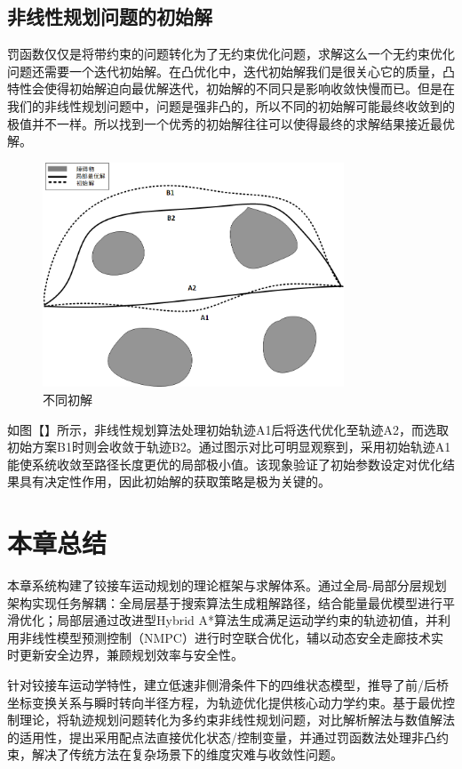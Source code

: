 \documentclass[master,academic]{ysuthesis} %
\begin{document}
		\subsection{非线性规划问题的初始解}
		罚函数仅仅是将带约束的问题转化为了无约束优化问题，求解这么一个无约束优化问题还需要一个迭代初始解。在凸优化中，迭代初始解我们是很关心它的质量，凸特性会使得初始解迫向最优解迭代，初始解的不同只是影响收敛快慢而已。但是在我们的非线性规划问题中，问题是强非凸的，所以不同的初始解可能最终收敛到的极值并不一样。所以找到一个优秀的初始解往往可以使得最终的求解结果接近最优解。
		\begin{figure}[!ht]
			\centering
			\includegraphics[width=0.8\textwidth]{不同初解.png}
			\caption{不同初解}
			\label{fig:不同初解}
		\end{figure}
		如图【】所示，非线性规划算法处理初始轨迹A1后将迭代优化至轨迹A2，而选取初始方案B1时则会收敛于轨迹B2。通过图示对比可明显观察到，采用初始轨迹A1能使系统收敛至路径长度更优的局部极小值。该现象验证了初始参数设定对优化结果具有决定性作用，因此初始解的获取策略是极为关键的。

	\section{本章总结}
	本章系统构建了铰接车运动规划的理论框架与求解体系。通过全局-局部分层规划架构实现任务解耦：全局层基于搜索算法生成粗解路径，结合能量最优模型进行平滑优化；局部层通过改进型Hybrid A*算法生成满足运动学约束的轨迹初值，并利用非线性模型预测控制（NMPC）进行时空联合优化，辅以动态安全走廊技术实时更新安全边界，兼顾规划效率与安全性。

	针对铰接车运动学特性，建立低速非侧滑条件下的四维状态模型，推导了前/后桥坐标变换关系与瞬时转向半径方程，为轨迹优化提供核心动力学约束。基于最优控制理论，将轨迹规划问题转化为多约束非线性规划问题，对比解析解法与数值解法的适用性，提出采用配点法直接优化状态/控制变量，并通过罚函数法处理非凸约束，解决了传统方法在复杂场景下的维度灾难与收敛性问题。
\end{document}
